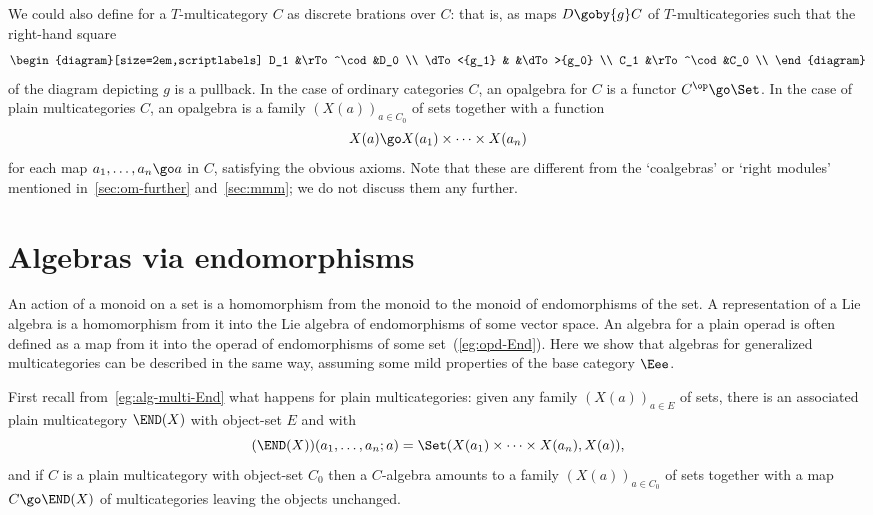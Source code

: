 We could also define %
% 
%
%
%
for a $T$-multicategory $C$ as discrete%
%
%
 brations over $C$: that is, as
maps $D \goby{g} C$ of $T$-multicategories such that the right-hand square
\[
\begin{diagram}[size=2em,scriptlabels]
D_1 		&\rTo^\cod	&D_0		\\
\dTo<{g_1}	&		&\dTo>{g_0}	\\
C_1		&\rTo^\cod	&C_0		\\
\end{diagram}
\]
of the diagram depicting $g$ is a pullback.  In the case of ordinary
categories $C$, an opalgebra for $C$ is a functor $C^\op \go \Set$.  In the
case of plain multicategories $C$, an opalgebra is a family $(X(a))_{a \in
C_0}$ of sets together with a function
\[
X(a) \go X(a_1) \times\cdots\times X(a_n)
\]
for each map $a_1, \ldots, a_n \go a$ in $C$, satisfying the obvious
axioms.  Note that these are different from the `coalgebras' or `right
modules' mentioned in~\ref{sec:om-further} and~\ref{sec:mmm}; we do not
discuss them any further.



\section{Algebras via endomorphisms}

An action of a monoid on a set is a homomorphism from the monoid to the
monoid of endomorphisms of the set.  A representation of a Lie algebra is a
homomorphism from it into the Lie algebra of endomorphisms of some vector
space.  An algebra for a plain operad is often defined as a map from it
into the operad of endomorphisms of some set~(\ref{eg:opd-End}).  Here we
show that algebras for generalized multicategories can be described in the
same way, assuming some mild properties of the base category $\Eee$.

First recall from~\ref{eg:alg-multi-End} what happens for plain
multicategories: given any family $(X(a))_{a\in E}$ of sets, there is an
associated plain multicategory $\END(X)$ with object-set $E$ and with
%
\begin{equation}	\label{eq:cl-endo}
(\END(X))(a_1, \ldots, a_n; a)
=
\Set (X(a_1) \times\cdots\times X(a_n), X(a) ),
\end{equation}
%
and if $C$ is a plain multicategory with object-set $C_0$ then a
$C$-algebra amounts to a family $(X(a))_{a\in C_0}$ of sets together with a
map $C \go \END(X)$ of multicategories leaving the objects unchanged.

